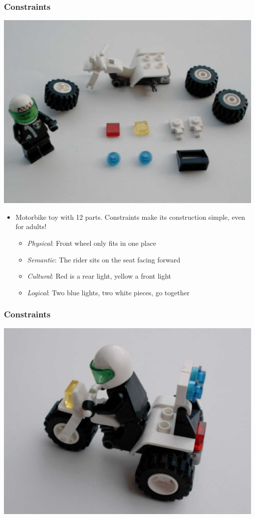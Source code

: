 \documentclass{beamer}
\begin{document}
\begin{frame}
\frametitle{Constraints}
\centering
\includegraphics[width=0.50\linewidth]{lego1}
\begin{itemize}
\item Motorbike toy with 12 parts. Constraints make its construction simple, even for adults!
\begin{itemize}
	\item \textit{Physical}: Front wheel only fits in one place
	\item \textit{Semantic}: The rider sits on the seat facing forward
	\item \textit{Cultural}: Red is a rear light, yellow a front light
	\item \textit{Logical}: Two blue lights, two white pieces, go together
\end{itemize}
\end{itemize}
\end{frame}

\begin{frame}
\frametitle{Constraints}
\centering
\includegraphics[width=0.7\linewidth]{lego2}
\end{frame}
\end{document}
